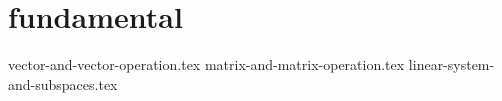 \part{fundamental}
{vector-and-vector-operation.tex}
{matrix-and-matrix-operation.tex}
{linear-system-and-subspaces.tex}
